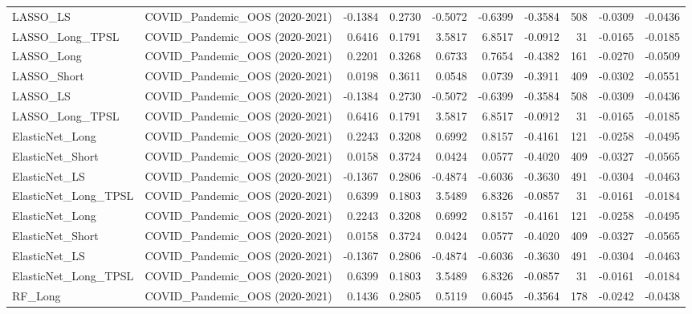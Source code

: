 \begin{tabular}{llrrrrrrrr}
\cline{1-10}
LASSO\_LS & COVID\_Pandemic\_OOS (2020-2021) & -0.1384 & 0.2730 & -0.5072 & -0.6399 & -0.3584 & 508 & -0.0309 & -0.0436 \\
\cline{1-10}
LASSO\_Long\_TPSL & COVID\_Pandemic\_OOS (2020-2021) & 0.6416 & 0.1791 & 3.5817 & 6.8517 & -0.0912 & 31 & -0.0165 & -0.0185 \\
\cline{1-10}
LASSO\_Long & COVID\_Pandemic\_OOS (2020-2021) & 0.2201 & 0.3268 & 0.6733 & 0.7654 & -0.4382 & 161 & -0.0270 & -0.0509 \\
\cline{1-10}
LASSO\_Short & COVID\_Pandemic\_OOS (2020-2021) & 0.0198 & 0.3611 & 0.0548 & 0.0739 & -0.3911 & 409 & -0.0302 & -0.0551 \\
\cline{1-10}
LASSO\_LS & COVID\_Pandemic\_OOS (2020-2021) & -0.1384 & 0.2730 & -0.5072 & -0.6399 & -0.3584 & 508 & -0.0309 & -0.0436 \\
\cline{1-10}
LASSO\_Long\_TPSL & COVID\_Pandemic\_OOS (2020-2021) & 0.6416 & 0.1791 & 3.5817 & 6.8517 & -0.0912 & 31 & -0.0165 & -0.0185 \\
\cline{1-10}
ElasticNet\_Long & COVID\_Pandemic\_OOS (2020-2021) & 0.2243 & 0.3208 & 0.6992 & 0.8157 & -0.4161 & 121 & -0.0258 & -0.0495 \\
\cline{1-10}
ElasticNet\_Short & COVID\_Pandemic\_OOS (2020-2021) & 0.0158 & 0.3724 & 0.0424 & 0.0577 & -0.4020 & 409 & -0.0327 & -0.0565 \\
\cline{1-10}
ElasticNet\_LS & COVID\_Pandemic\_OOS (2020-2021) & -0.1367 & 0.2806 & -0.4874 & -0.6036 & -0.3630 & 491 & -0.0304 & -0.0463 \\
\cline{1-10}
ElasticNet\_Long\_TPSL & COVID\_Pandemic\_OOS (2020-2021) & 0.6399 & 0.1803 & 3.5489 & 6.8326 & -0.0857 & 31 & -0.0161 & -0.0184 \\
\cline{1-10}
ElasticNet\_Long & COVID\_Pandemic\_OOS (2020-2021) & 0.2243 & 0.3208 & 0.6992 & 0.8157 & -0.4161 & 121 & -0.0258 & -0.0495 \\
\cline{1-10}
ElasticNet\_Short & COVID\_Pandemic\_OOS (2020-2021) & 0.0158 & 0.3724 & 0.0424 & 0.0577 & -0.4020 & 409 & -0.0327 & -0.0565 \\
\cline{1-10}
ElasticNet\_LS & COVID\_Pandemic\_OOS (2020-2021) & -0.1367 & 0.2806 & -0.4874 & -0.6036 & -0.3630 & 491 & -0.0304 & -0.0463 \\
\cline{1-10}
ElasticNet\_Long\_TPSL & COVID\_Pandemic\_OOS (2020-2021) & 0.6399 & 0.1803 & 3.5489 & 6.8326 & -0.0857 & 31 & -0.0161 & -0.0184 \\
\cline{1-10}
RF\_Long & COVID\_Pandemic\_OOS (2020-2021) & 0.1436 & 0.2805 & 0.5119 & 0.6045 & -0.3564 & 178 & -0.0242 & -0.0438 \\

\end{tabular}
